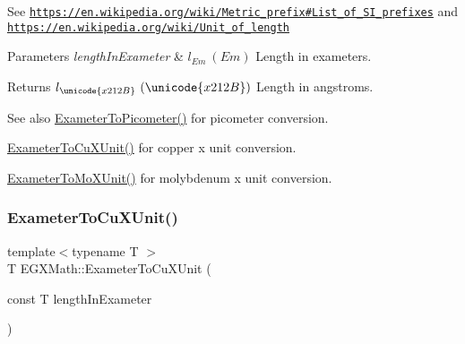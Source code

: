 See \href{https://en.wikipedia.org/wiki/Metric_prefix#List_of_SI_prefixes}{\tt https\+://en.\+wikipedia.\+org/wiki/\+Metric\+\_\+prefix\#\+List\+\_\+of\+\_\+\+S\+I\+\_\+prefixes} and \href{https://en.wikipedia.org/wiki/Unit_of_length}{\tt https\+://en.\+wikipedia.\+org/wiki/\+Unit\+\_\+of\+\_\+length} 
\begin{DoxyParams}{Parameters}
{\em length\+In\+Exameter} & $ l_{Em}\ (Em)$ Length in exameters. \\
\hline
\end{DoxyParams}
\begin{DoxyReturn}{Returns}
$ l_{\unicode{x212B}}\ (\unicode{x212B})$ Length in angstroms. 
\end{DoxyReturn}
\begin{DoxySeeAlso}{See also}
\mbox{\hyperlink{group___e_g_x_math-_conversions-_length_conversions-_s_i-_exameter-_s_i_gaf524e8324fedf2eb61d43ce1dc36bcac}{Exameter\+To\+Picometer()}} for picometer conversion. 

\mbox{\hyperlink{group___e_g_x_math-_conversions-_length_conversions-_s_i-_exameter-_non-_s_i_gacb2c9fea6b2c2d12ee485f378f5a6af0}{Exameter\+To\+Cu\+X\+Unit()}} for copper x unit conversion. 

\mbox{\hyperlink{group___e_g_x_math-_conversions-_length_conversions-_s_i-_exameter-_non-_s_i_gadf73e46609660df6b7ae77ec7241183e}{Exameter\+To\+Mo\+X\+Unit()}} for molybdenum x unit conversion. 
\end{DoxySeeAlso}
\mbox{\label{group___e_g_x_math-_conversions-_length_conversions-_s_i-_exameter-_non-_s_i_gacb2c9fea6b2c2d12ee485f378f5a6af0}} 
\subsubsection{\texorpdfstring{Exameter\+To\+Cu\+X\+Unit()}{ExameterToCuXUnit()}}
{\footnotesize\ttfamily template$<$typename T $>$ \\
T E\+G\+X\+Math\+::\+Exameter\+To\+Cu\+X\+Unit (\begin{DoxyParamCaption}\item[{const T}]{length\+In\+Exameter }\end{DoxyParamCaption})}



